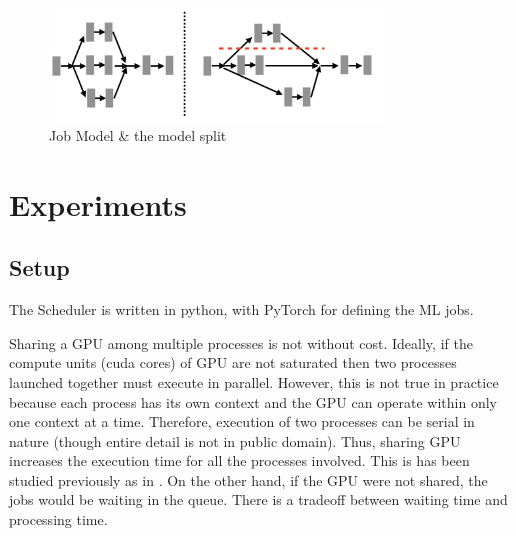 \begin{figure}[htbp]
\centerline{\includegraphics[height=3cm]{figures/layers.png}}
\caption{Job Model \& the model split}
\label{fig4}
\end{figure}


\section{Experiments}
\label{sec:results}

\subsection{Setup}

The Scheduler is written in python, with PyTorch for defining the ML jobs.

Sharing a GPU among multiple processes is not without cost. Ideally, if the
compute units (cuda cores) of GPU are not saturated then two processes launched
together must execute in parallel. However, this is not true in practice because
each process has its own context and the GPU can operate within only one context
at a time. Therefore, execution of two processes can be serial in nature (though
entire detail is not in public domain). Thus, sharing GPU increases the
execution time for all the processes involved. This is has been studied
previously as in \cite{gandiva}. On the other hand, if the GPU were not shared,
the jobs would be waiting in the queue. There is a tradeoff between waiting time
and processing time. 

